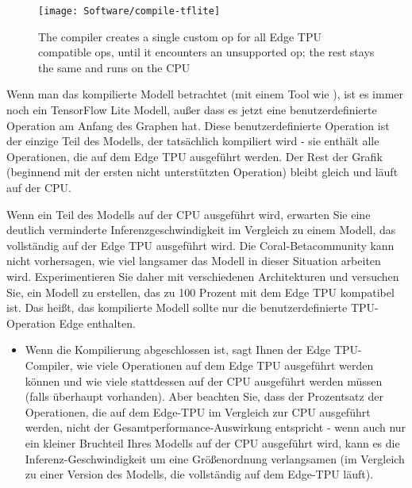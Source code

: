 \begin{figure}[!h]
	\centering
	\texttt{[image: Software/compile-tflite]} 
	
	\caption{The compiler creates a single custom op for all Edge TPU compatible ops, until it encounters an unsupported op; the rest stays the same and runs on the CPU\cite{GoogleTensorFlowModel:2019}} 
\end{figure}

Wenn man das kompilierte Modell betrachtet (mit einem Tool wie ), ist es immer noch ein TensorFlow Lite Modell, außer dass es jetzt eine benutzerdefinierte Operation am Anfang des Graphen hat. Diese benutzerdefinierte Operation ist der einzige Teil des Modells, der tatsächlich kompiliert wird - sie enthält alle Operationen, die auf dem Edge TPU ausgeführt werden. Der Rest der Grafik (beginnend mit der ersten nicht unterstützten Operation) bleibt gleich und läuft auf der CPU.

\bigskip

Wenn ein Teil des Modells auf der CPU ausgeführt wird, erwarten Sie eine deutlich verminderte Inferenzgeschwindigkeit im Vergleich zu einem Modell, das vollständig auf der Edge TPU ausgeführt wird. Die Coral-Betacommunity kann nicht vorhersagen, wie viel langsamer das Modell in dieser Situation arbeiten wird. Experimentieren Sie daher mit verschiedenen Architekturen und versuchen Sie, ein Modell zu erstellen, das zu 100 Prozent mit dem Edge TPU kompatibel ist. Das heißt, das kompilierte Modell sollte nur die benutzerdefinierte TPU-Operation Edge enthalten.

\bigskip

\begin{itemize}
	\item Wenn die Kompilierung abgeschlossen ist, sagt Ihnen der Edge TPU-Compiler, wie viele Operationen auf dem Edge TPU ausgeführt werden können und wie viele stattdessen auf der CPU ausgeführt werden müssen (falls überhaupt vorhanden). Aber beachten Sie, dass der Prozentsatz der Operationen, die auf dem Edge-TPU im Vergleich zur CPU ausgeführt werden, nicht der Gesamtperformance-Auswirkung entspricht - wenn auch nur ein kleiner Bruchteil Ihres Modells auf der CPU ausgeführt wird, kann es die Inferenz-Geschwindigkeit um eine Größenordnung verlangsamen (im Vergleich zu einer Version des Modells, die vollständig auf dem Edge-TPU läuft).
\end{itemize}

